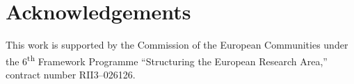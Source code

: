 \begin{spacing}{0.92}
\tableofcontents
\end{spacing}











\appendix





\printglossaries

\section*{Acknowledgements}
This work is supported by the Commission of the European Communities
under the 6\textsuperscript{th} Framework Programme
``Structuring the European Research Area,'' contract number RII3--026126.

%




